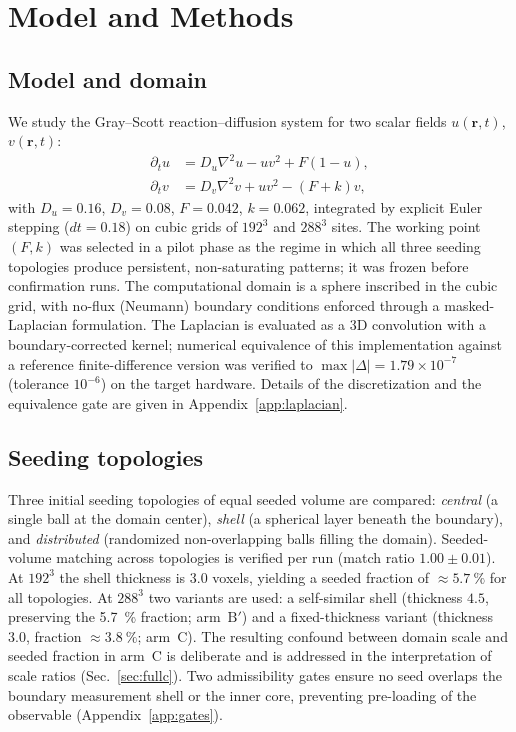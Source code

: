 \documentclass[aps,pre,preprint,superscriptaddress,nofootinbib,floatfix]{revtex4-2}
\begin{document}
\section{Model and Methods}
\label{sec:methods}

\subsection{Model and domain}

We study the Gray--Scott reaction--diffusion system for two scalar fields $u(\mathbf{r},t)$, $v(\mathbf{r},t)$:
\begin{align}
\partial_t u &= D_u \nabla^2 u - uv^2 + F(1-u),\\
\partial_t v &= D_v \nabla^2 v + uv^2 - (F+k)v,
\end{align}
with $D_u=0.16$, $D_v=0.08$, $F=0.042$, $k=0.062$, integrated by explicit Euler stepping ($dt=0.18$) on cubic grids of $192^3$ and $288^3$ sites. The working point $(F,k)$ was selected in a pilot phase as the regime in which all three seeding topologies produce persistent, non-saturating patterns; it was frozen before confirmation runs. The computational domain is a sphere inscribed in the cubic grid, with no-flux (Neumann) boundary conditions enforced through a masked-Laplacian formulation. The Laplacian is evaluated as a 3D convolution with a boundary-corrected kernel; numerical equivalence of this implementation against a reference finite-difference version was verified to $\max|\Delta|=1.79\times10^{-7}$ (tolerance $10^{-6}$) on the target hardware. Details of the discretization and the equivalence gate are given in Appendix~\ref{app:laplacian}.

\subsection{Seeding topologies}

Three initial seeding topologies of equal seeded volume are compared: \textit{central} (a single ball at the domain center), \textit{shell} (a spherical layer beneath the boundary), and \textit{distributed} (randomized non-overlapping balls filling the domain). Seeded-volume matching across topologies is verified per run (match ratio $1.00\pm0.01$). At $192^3$ the shell thickness is $3.0$ voxels, yielding a seeded fraction of ${\approx}\SI{5.7}{\percent}$ for all topologies. At $288^3$ two variants are used: a self-similar shell (thickness $4.5$, preserving the \SI{5.7}{\percent} fraction; arm~$\mathrm{B}'$) and a fixed-thickness variant (thickness $3.0$, fraction ${\approx}\SI{3.8}{\percent}$; arm~C). The resulting confound between domain scale and seeded fraction in arm~C is deliberate and is addressed in the interpretation of scale ratios (Sec.~\ref{sec:fullc}). Two admissibility gates ensure no seed overlaps the boundary measurement shell or the inner core, preventing pre-loading of the observable (Appendix~\ref{app:gates}).
\end{document}
